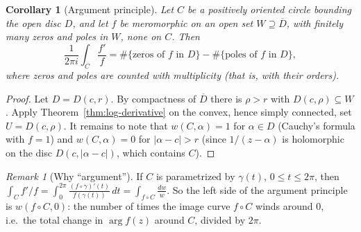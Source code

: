 \documentclass[11pt]{article}
\theoremstyle{plain}
\newtheorem{corollary}[theorem]{Corollary}
\theoremstyle{definition}
\theoremstyle{remark}
\newtheorem*{remark}{Remark}
\numberwithin{equation}{section}
\newenvironment{lecturefigure}
 {\par\addvspace{0.25em}\begingroup\setlength{\parskip}{0pt}\centering}
 {\par\endgroup\addvspace{0.25em}}
\begin{document}
\begin{corollary}[Argument principle]\label{cor:argument}
Let $C$ be a positively oriented circle bounding the open disc $D$, and
let $f$ be meromorphic on an open set $W\supseteq\overline D$, with finitely
many zeros and poles in $W$, none on $C$. Then
\[
 \boxed{\frac{1}{2\pi i}\int_C\frac{f'}{f}
 =\#\{\text{zeros of $f$ in $D$}\}-\#\{\text{poles of $f$ in $D$}\},}
\]
where zeros and poles are counted with multiplicity (that is, with their
orders).
\end{corollary}
\begin{proof}
Let $D=D(c,r)$. By compactness of $\overline D$ there is $\rho>r$ with
$D(c,\rho)\subseteq W$. Apply Theorem~\ref{thm:log-derivative} on the
convex, hence simply connected, set $U=D(c,\rho)$. It remains to note that
$w(C,\alpha)=1$ for $\alpha\in D$ (Cauchy's formula with $f=1$) and
$w(C,\alpha)=0$ for $|\alpha-c|>r$ (since $1/(z-\alpha)$ is holomorphic on
the disc $D(c,|\alpha-c|)$, which contains $C$).
\end{proof}

\begin{lecturefigure}
\end{lecturefigure}

\begin{remark}[Why ``argument'']
If $C$ is parametrized by $\gamma(t)$, $0\leq t\leq2\pi$, then
$\int_C f'/f=\int_0^{2\pi}\frac{(f\circ\gamma)'(t)}{f(\gamma(t))}\,dt
=\int_{f\circ C}\frac{dw}{w}$. So the left side of the argument principle
is $w(f\circ C,0)$: the number of times the image curve $f\circ C$ winds
around $0$, i.e.\ the total change in $\arg f(z)$ around $C$, divided by
$2\pi$.
\end{remark}
\end{document}
